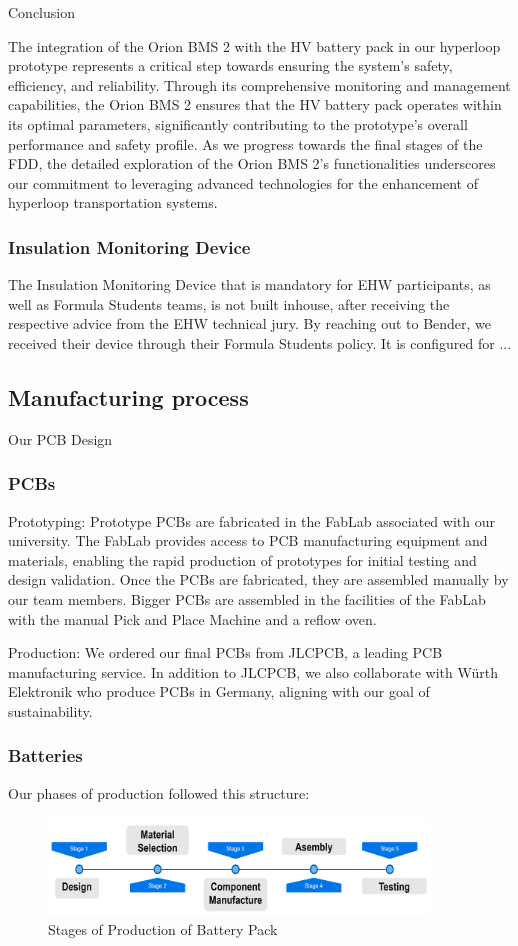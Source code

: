 Conclusion

The integration of the Orion BMS 2 with the HV battery pack in our hyperloop prototype represents a critical step towards ensuring the system's safety, efficiency, and reliability. Through its comprehensive monitoring and management capabilities, the Orion BMS 2 ensures that the HV battery pack operates within its optimal parameters, significantly contributing to the prototype's overall performance and safety profile. As we progress towards the final stages of the FDD, the detailed exploration of the Orion BMS 2's functionalities underscores our commitment to leveraging advanced technologies for the enhancement of hyperloop transportation systems.
\subsubsection{Insulation Monitoring Device}
The Insulation Monitoring Device that is mandatory for EHW participants, as well as Formula Students teams, is not built inhouse, after receiving the respective advice from the EHW technical jury. By reaching out to Bender, we received their device through their Formula Students policy. It is configured for ...


\subsection{Manufacturing process}
Our PCB Design

\subsubsection{PCBs}
Prototyping: Prototype PCBs are fabricated in the FabLab associated with our university. The FabLab provides access to PCB manufacturing equipment and materials, enabling the rapid production of prototypes for initial testing and design validation. Once the PCBs are fabricated, they are assembled manually by our team members. Bigger PCBs are assembled in the facilities of the FabLab with the manual Pick and Place Machine and a reflow oven.

Production: We ordered our final PCBs from JLCPCB, a leading PCB manufacturing service. In addition to JLCPCB, we also collaborate with Würth Elektronik who produce PCBs in Germany, aligning with our goal of sustainability.

\subsubsection{Batteries}
Our phases of production followed this structure:
\begin{figure}[H]
    \centering
    \includegraphics[width=0.9\textwidth]{texfiles/elec/eimg/BatteryProduction}
    \caption{Stages of Production of Battery Pack}
    \label{img: batteryproduction}
\end{figure}

